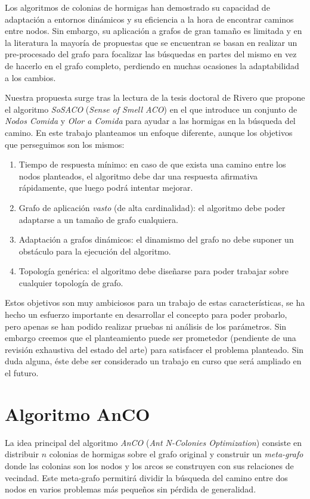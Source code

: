 \documentclass{llncs}
\begin{document}
Los algoritmos de colonias de hormigas han demostrado su capacidad de adaptación a entornos dinámicos y su eficiencia a la hora de encontrar caminos entre nodos.
Sin embargo, su aplicación a grafos de gran tamaño es limitada y en la literatura la mayoría de propuestas que se encuentran se basan en realizar un pre-procesado del grafo para focalizar las búsquedas en partes del mismo en vez de hacerlo en el grafo completo, perdiendo en muchas ocasiones la adaptabilidad a los cambios.

Nuestra propuesta surge tras la lectura de la tesis doctoral de Rivero \cite{Rivero2011} que propone el algoritmo \textit{SoSACO} (\textit{Sense of Smell ACO}) en el que introduce un conjunto de \textit{Nodos Comida} y \textit{Olor a Comida} para ayudar a las hormigas en la búsqueda del camino.
En este trabajo planteamos un enfoque diferente, aunque los objetivos que perseguimos son los mismos:
\begin{enumerate}
  \item Tiempo de respuesta mínimo: en caso de que exista una camino entre los nodos planteados, el algoritmo debe dar una respuesta afirmativa rápidamente, que luego podrá intentar mejorar.
  \item Grafo de aplicación \textit{vasto} (de alta cardinalidad): el algoritmo debe poder adaptarse a un tamaño de grafo cualquiera.
  \item Adaptación a grafos dinámicos: el dinamismo del grafo no debe suponer un obstáculo para la ejecución del algoritmo.
  \item Topología genérica: el algoritmo debe diseñarse para poder trabajar sobre cualquier topología de grafo.
\end{enumerate}

Estos objetivos son muy ambiciosos para un trabajo de estas características, se ha hecho un esfuerzo importante en desarrollar el concepto para poder probarlo, pero apenas se han podido realizar pruebas ni análisis de los parámetros.
Sin embargo creemos que el planteamiento puede ser prometedor (pendiente de una revisión exhaustiva del estado del arte) para satisfacer el problema planteado.
Sin duda alguna, éste debe ser considerado un trabajo en curso que será ampliado en el futuro.







\section{Algoritmo AnCO}
La idea principal del algoritmo \textit{AnCO} (\textit{Ant N-Colonies Optimization}) consiste en distribuir $n$ colonias de hormigas sobre el grafo original y construir un \textit{meta-grafo} donde las colonias son los nodos y los arcos se construyen con sus relaciones de vecindad.
Este meta-grafo permitirá dividir la búsqueda del camino entre dos nodos en varios problemas más pequeños sin pérdida de generalidad.
\end{document}
